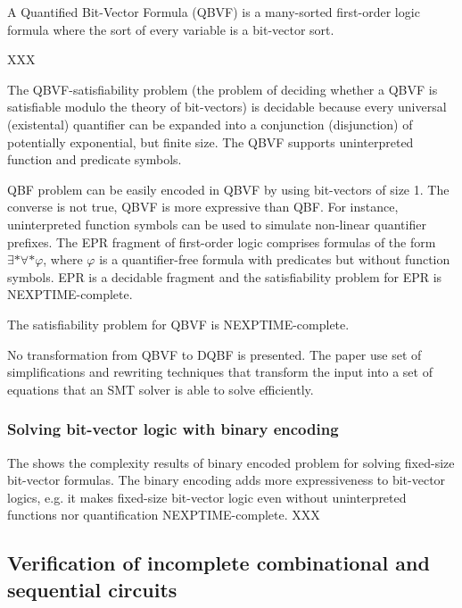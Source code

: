 \documentclass[runningheads]{llncs}
\begin{document}
A Quantified Bit-Vector Formula (QBVF) is a many-sorted
first-order logic formula where the sort of every variable
is a bit-vector sort.

\begin{example}
  XXX
\end{example}

The QBVF-satisfiability problem (the problem of deciding whether a QBVF is satisfiable modulo the theory of bit-vectors) is decidable because every universal (existental) quantifier can be expanded into a conjunction (disjunction) of potentially exponential, but finite size.
The QBVF supports uninterpreted function and predicate symbols.

QBF problem can be easily encoded in QBVF
by using bit-vectors of size 1.
The converse is not true, QBVF is more expressive than QBF.
For instance, uninterpreted function symbols can be used to simulate non-linear quantifier prefixes.
The EPR fragment of first-order logic comprises formulas of the form $\exists * \forall * \varphi$, where $\varphi$ is a quantifier-free formula with predicates but without function symbols.
EPR is a decidable fragment and the satisfiability problem for
EPR is NEXPTIME-complete.

\begin{theorem}
  The satisfiability problem for QBVF is
  NEXPTIME-complete.
\end{theorem}

No transformation from QBVF to DQBF is presented. The paper use set of simplifications and rewriting techniques that transform the input into a set of equations that an SMT solver is able to solve efficiently.

\subsubsection{Solving bit-vector logic with binary encoding \cite{kovasznaifb12}}
The \cite{kovasznaifb12} shows the complexity results of binary encoded problem for solving fixed-size bit-vector formulas. The binary encoding adds more expressiveness to
bit-vector logics, e.g. it makes fixed-size bit-vector logic even without uninterpreted functions nor quantification NEXPTIME-complete. XXX

\subsection{Verification of incomplete combinational and sequential circuits}\label{subsec:pec}
\end{document}
